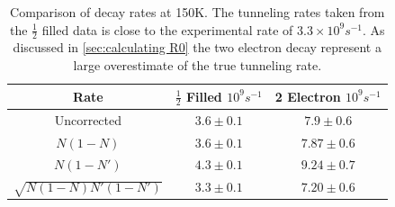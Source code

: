 \begin{table}[htbp]
    \begin{center}
        \begin{tabular}{ *{3}{c} }
            \toprule
            Rate                      & \(\frac{1}{2}\) Filled \(10^{9} s^{-1}\) & 2 Electron \(10^{9} s^{-1}\) \\
            \midrule
            Uncorrected               & \(3.6\pm 0.1\)                           & \(7.9\pm 0.6\)               \\
            \(N(1-N)\)                & \(3.6\pm 0.1\)                           & \(7.87\pm 0.6\)              \\
            \(N(1-N')\)               & \(4.3\pm 0.1\)                           & \(9.24\pm 0.7\)              \\
            \(\sqrt{N(1-N)N'(1-N')}\) & \(3.3\pm 0.1\)                           & \(7.20\pm 0.6\)              \\
            \bottomrule
        \end{tabular}
    \end{center}
    \caption{Comparison
    of decay rates at 150K.
    The tunneling rates
    taken from the
    \(\frac{1}{2}\) filled
    data is close to the
    experimental rate of
    \(3.3\times{}10^{9}s^{-1}\).
    As discussed in
    \cref{sec:calculating R0}
    the two electron decay
    represent a large
    overestimate of the
    true tunneling rate.
    }\label{tab:decay rates simulated 150K}
\end{table}

